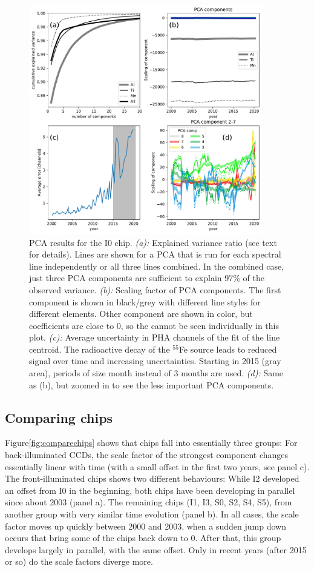 \documentclass[]{spie}  %
\begin{document}
\begin{figure} [ht]
  \begin{center}
    \includegraphics[height=10cm]{figures/PCA_details_i0.pdf}
  \end{center}
  \caption
      {PCA results for the I0 chip. \emph{(a):} Explained variance ratio (see text for details). Lines are shown for a PCA that is run for each spectral line independently or all three lines combined. In the combined case, just three PCA components are sufficient to explain 97\% of the observed variance. \emph{(b):} Scaling factor of PCA components. The first component is shown in black/grey with different line styles for different elements. Other component are shown in color, but coefficients are close to 0, so the cannot be seen individually in this plot. \emph{(c):} Average uncertainty in PHA channels of the fit of the line centroid. The radioactive decay of the $^{55}$Fe source leads to reduced signal over time and increasing uncertainties. Starting in 2015 (gray area), periods of size month instead of 3 months are used. \emph{(d):} Same as (b), but zoomed in to see the less important PCA components.
      \label{fig:explvar}}
\end{figure}

\subsection{Comparing chips}
Figure\ref{fig:comparechips} shows that chips fall into essentially three groups: For back-illuminated CCDs, the scale factor of the strongest component changes essentially linear with time (with a small offset in the first two years, see panel c). The front-illuminated chips shows two different behaviours: While I2 developed an offset from I0 in the beginning, both chips have been developing in parallel since about 2003 (panel a). The remaining chips (I1, I3, S0, S2, S4, S5), from another group with very similar time evolution (panel b). In all cases, the scale factor moves up quickly between 2000 and 2003, when a sudden jump down occurs that bring some of the chips back down to 0. After that, this group develops largely in parallel, with the same offset. Only in recent years (after 2015 or so) do the scale factors diverge more.
\end{document}

